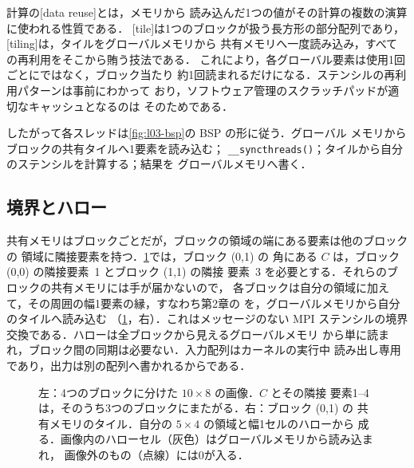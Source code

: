 \documentclass[../main.tex]{subfiles}
\begin{document}
\begin{definition}
  計算の[data reuse]とは，メモリから
  読み込んだ1つの値がその計算の複数の演算に使われる性質である．
  [tile]は1つのブロックが扱う長方形の部分配列であり，
  [tiling]は，タイルをグローバルメモリから
  共有メモリへ一度読み込み，すべての再利用をそこから賄う技法である．
  これにより，各グローバル要素は使用1回ごとにではなく，ブロック当たり
  約1回読まれるだけになる．ステンシルの再利用パターンは事前にわかって
  おり，ソフトウェア管理のスクラッチパッドが適切なキャッシュとなるのは
  そのためである．
\end{definition}

したがって各スレッドは\cref{fig:l03-bsp}の BSP の形に従う．グローバル
メモリからブロックの共有タイルへ1要素を読み込む；
\texttt{\_\_syncthreads()}；タイルから自分のステンシルを計算する；結果を
グローバルメモリへ書く．

\subsection{境界とハロー}

共有メモリはブロックごとだが，ブロックの領域の端にある要素は他のブロックの
領域に隣接要素を持つ．\cref{fig:l03-stencil-tile}では，ブロック (0,1) の
角にある $C$ は，ブロック (0,0) の隣接要素~1 とブロック (1,1) の隣接
要素~3 を必要とする．それらのブロックの共有メモリには手が届かないので，
各ブロックは自分の領域に加えて，その周囲の幅1要素の縁，すなわち第2章の
を，グローバルメモリから自分のタイルへ読み込む
（\cref{fig:l03-stencil-tile}，右）．これはメッセージのない MPI
ステンシルの境界交換である．ハローは全ブロックから見えるグローバルメモリ
から単に読まれ，ブロック間の同期は必要ない．入力配列はカーネルの実行中
読み出し専用であり，出力は別の配列へ書かれるからである．

\begin{figure}[tb]
  \centering
  
  \caption{左：4つのブロックに分けた $10\times8$ の画像．$C$ とその隣接
    要素1--4は，そのうち3つのブロックにまたがる．右：ブロック (0,1) の
    共有メモリのタイル．自分の $5\times4$ の領域と幅1セルのハローから
    成る．画像内のハローセル（灰色）はグローバルメモリから読み込まれ，
    画像外のもの（点線）には0が入る．}
  \label{fig:l03-stencil-tile}
\end{figure}
\end{document}
